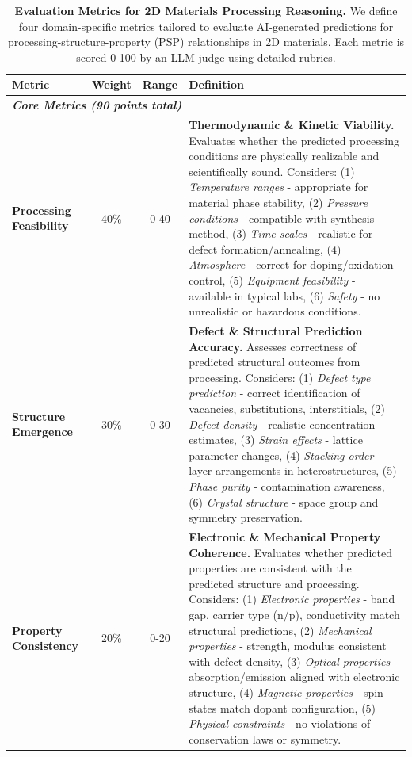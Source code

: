 
\begin{table}[ht!]
\centering
\caption{\textbf{Evaluation Metrics for 2D Materials Processing Reasoning.}
We define four domain-specific metrics tailored to evaluate AI-generated predictions
for processing-structure-property (PSP) relationships in 2D materials. Each metric
is scored 0-100 by an LLM judge using detailed rubrics.}
\label{tab:metrics_2d}
\small
\begin{tabular}{lccp{9cm}}
\toprule
\textbf{Metric} & \textbf{Weight} & \textbf{Range} & \textbf{Definition} \\
\midrule
\multicolumn{4}{l}{\textit{\textbf{Core Metrics (90 points total)}}} \\
\midrule

\textbf{Processing Feasibility} & 40\% & 0-40 &
\textbf{Thermodynamic \& Kinetic Viability.} Evaluates whether the predicted
processing conditions are physically realizable and scientifically sound.
Considers: (1) \textit{Temperature ranges} - appropriate for material phase stability,
(2) \textit{Pressure conditions} - compatible with synthesis method,
(3) \textit{Time scales} - realistic for defect formation/annealing,
(4) \textit{Atmosphere} - correct for doping/oxidation control,
(5) \textit{Equipment feasibility} - available in typical labs,
(6) \textit{Safety} - no unrealistic or hazardous conditions.
\\
\midrule

\textbf{Structure Emergence} & 30\% & 0-30 &
\textbf{Defect \& Structural Prediction Accuracy.} Assesses correctness of
predicted structural outcomes from processing. Considers:
(1) \textit{Defect type prediction} - correct identification of vacancies,
substitutions, interstitials, (2) \textit{Defect density} - realistic concentration
estimates, (3) \textit{Strain effects} - lattice parameter changes,
(4) \textit{Stacking order} - layer arrangements in heterostructures,
(5) \textit{Phase purity} - contamination awareness,
(6) \textit{Crystal structure} - space group and symmetry preservation.
\\
\midrule

\textbf{Property Consistency} & 20\% & 0-20 &
\textbf{Electronic \& Mechanical Property Coherence.} Evaluates whether predicted
properties are consistent with the predicted structure and processing. Considers:
(1) \textit{Electronic properties} - band gap, carrier type (n/p), conductivity
match structural predictions, (2) \textit{Mechanical properties} - strength,
modulus consistent with defect density, (3) \textit{Optical properties} -
absorption/emission aligned with electronic structure,
(4) \textit{Magnetic properties} - spin states match dopant configuration,
(5) \textit{Physical constraints} - no violations of conservation laws or symmetry.
\\
\midrule


\end{tabular}
\end{table}
